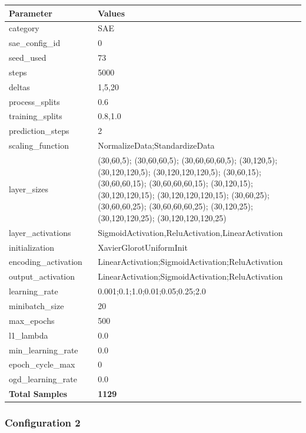 \documentclass[a4paper,11pt,oneside]{article}
\theoremstyle{plain}
\theoremstyle{definition}
\begin{document}
	\begin{longtable}[H]{|p{0.3\linewidth}|p{0.7\linewidth}|} \hline 			\rowcolor{beaublue} \textbf{Parameter} &\textbf{Values} \\\hline{category} & {SAE} \\\hline
		{sae\_config\_id} & {0} \\\hline
		{seed\_used} & {73} \\\hline
		{steps} & {5000} \\\hline
		{deltas} & {1,5,20} \\\hline
		{process\_splits} & {0.6} \\\hline
		{training\_splits} & {0.8,1.0} \\\hline
		{prediction\_steps} & {2} \\\hline
		{scaling\_function} & {NormalizeData;StandardizeData} \\\hline
		{layer\_sizes} & {(30,60,5); (30,60,60,5); (30,60,60,60,5); (30,120,5); (30,120,120,5); (30,120,120,120,5); (30,60,15); (30,60,60,15); (30,60,60,60,15); (30,120,15); (30,120,120,15); (30,120,120,120,15); (30,60,25); (30,60,60,25); (30,60,60,60,25); (30,120,25); (30,120,120,25); (30,120,120,120,25)} \\\hline
		{layer\_activations} & {SigmoidActivation,ReluActivation,LinearActivation} \\\hline
		{initialization} & {XavierGlorotUniformInit} \\\hline
		{encoding\_activation} & {LinearActivation;SigmoidActivation;ReluActivation} \\\hline
		{output\_activation} & {LinearActivation;SigmoidActivation;ReluActivation} \\\hline
		{learning\_rate} & {0.001;0.1;1.0;0.01;0.05;0.25;2.0} \\\hline
		{minibatch\_size} & {20} \\\hline
		{max\_epochs} & {500} \\\hline
		{l1\_lambda} & {0.0} \\\hline
		{min\_learning\_rate} & {0.0} \\\hline
		{epoch\_cycle\_max} & {0} \\\hline
		{ogd\_learning\_rate} & {0.0} \\\hline
		{\textbf{Total Samples}} & {\textbf{1129}} \\\hline
	\end{longtable}
	
	
	\newpage
	\subsubsection{Configuration 2}\label{config2}
\end{document}
